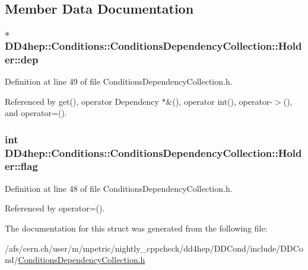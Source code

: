 \subsection{Member Data Documentation}
\hypertarget{struct_d_d4hep_1_1_conditions_1_1_conditions_dependency_collection_1_1_holder_a958102c9c47e86d3f479021dd1e570f6}{
\subsubsection[{dep}]{$\ast$ {\bf DD4hep::Conditions::ConditionsDependencyCollection::Holder::dep}}}
\label{struct_d_d4hep_1_1_conditions_1_1_conditions_dependency_collection_1_1_holder_a958102c9c47e86d3f479021dd1e570f6}


Definition at line 49 of file ConditionsDependencyCollection.h.

Referenced by get(), operator Dependency $\ast$\&(), operator int(), operator-\/$>$(), and operator=().\hypertarget{struct_d_d4hep_1_1_conditions_1_1_conditions_dependency_collection_1_1_holder_a0e505e33fbee2f24378e55527d99c6d3}{
\subsubsection[{flag}]{\setlength{\rightskip}{0pt plus 5cm}int {\bf DD4hep::Conditions::ConditionsDependencyCollection::Holder::flag}}}
\label{struct_d_d4hep_1_1_conditions_1_1_conditions_dependency_collection_1_1_holder_a0e505e33fbee2f24378e55527d99c6d3}


Definition at line 48 of file ConditionsDependencyCollection.h.

Referenced by operator=().

The documentation for this struct was generated from the following file:\begin{DoxyCompactItemize}
\item 
/afs/cern.ch/user/m/mpetric/nightly\_\-cppcheck/dd4hep/DDCond/include/DDCond/\hyperlink{_conditions_dependency_collection_8h}{ConditionsDependencyCollection.h}\end{DoxyCompactItemize}
